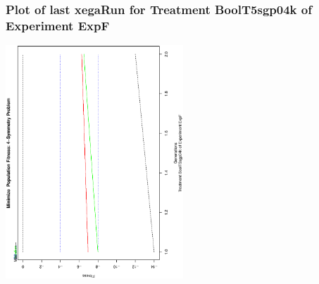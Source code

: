  \begin{frame}
 \frametitle{ Plot of last xegaRun for Treatment BoolT5sgp04k of Experiment ExpF }
 \begin{center}
\includegraphics[width=0.5\textwidth, angle=-90]
{ExpFPlotPopStatsFigure002.eps}
 \end{center}
 \label{report/ExpFPlotPopStatsFigure002.eps}  
 \end{frame}


